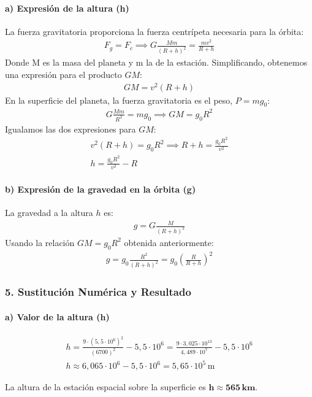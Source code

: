 \paragraph*{a) Expresión de la altura (h)}
La fuerza gravitatoria proporciona la fuerza centrípeta necesaria para la órbita:
\begin{gather}
    F_g = F_c \implies G\frac{M m}{(R+h)^2} = \frac{m v^2}{R+h}
\end{gather}
Donde M es la masa del planeta y m la de la estación. Simplificando, obtenemos una expresión para el producto $GM$:
\begin{gather}
    GM = v^2 (R+h)
\end{gather}
En la superficie del planeta, la fuerza gravitatoria es el peso, $P = mg_0$:
\begin{gather}
    G\frac{M m}{R^2} = m g_0 \implies GM = g_0 R^2
\end{gather}
Igualamos las dos expresiones para $GM$:
\begin{gather}
    v^2(R+h) = g_0 R^2 \implies R+h = \frac{g_0 R^2}{v^2} \nonumber \\
    h = \frac{g_0 R^2}{v^2} - R
\end{gather}

\paragraph*{b) Expresión de la gravedad en la órbita (g)}
La gravedad a la altura $h$ es:
\begin{gather}
    g = G\frac{M}{(R+h)^2}
\end{gather}
Usando la relación $GM = g_0 R^2$ obtenida anteriormente:
\begin{gather}
    g = g_0 \frac{R^2}{(R+h)^2} = g_0 \left(\frac{R}{R+h}\right)^2
\end{gather}

\subsubsection*{5. Sustitución Numérica y Resultado}
\paragraph*{a) Valor de la altura (h)}
\begin{gather}
    h = \frac{9 \cdot (5,5 \cdot 10^6)^2}{(6700)^2} - 5,5 \cdot 10^6 = \frac{9 \cdot 3,025 \cdot 10^{13}}{4,489 \cdot 10^7} - 5,5 \cdot 10^6 \nonumber \\
    h \approx 6,065 \cdot 10^6 - 5,5 \cdot 10^6 = 5,65 \cdot 10^5 \, \text{m}
\end{gather}
\begin{cajaresultado}
    La altura de la estación espacial sobre la superficie es $\boldsymbol{h \approx 565 \, \textbf{km}}$.
\end{cajaresultado}

